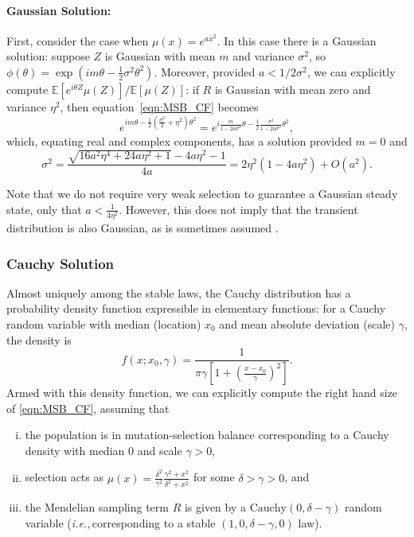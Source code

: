\documentclass{article}
\newcommand{\ie}{\textit{i.e.,}\,}
\newcommand{\1}{\mathbbm{1}}
\theoremstyle{remark}
\theoremstyle{definition}
\begin{document}
\paragraph{Gaussian Solution:}
First, consider the case when $\mu(x) = e^{a x^{2}}$.   In this case there is a Gaussian solution: suppose $Z$ is Gaussian with mean $m$ and variance $\sigma^{2}$, so
$ \phi(\theta) = \exp(i m \theta - \frac{1}{2} \sigma^{2} \theta^{2}).  $
Moreover, provided $a < 1 / 2\sigma^{2}$, we can explicitly compute
$\mathbb{E}\left[e^{i \theta Z}\mu(Z)\right] / \mathbb{E}[\mu(Z)]$:
if $R$ is Gaussian with mean zero and variance $\eta^2$, then equation~\eqref{eqn:MSB_CF} becomes
\[
	e^{i m \theta - \frac{1}{2} \left(\frac{\sigma^{2}}{2} + \eta^{2}\right)\theta^{2}}
	= e^{i \frac{m}{1-2 a \sigma^{2}}\theta 
		- \frac{1}{2} \frac{\sigma^{2}}{1-2 a \sigma^{2}}\theta^{2}},
\]
which, equating real and complex components, has a solution provided $m = 0$ and
\[
	\sigma^{2} = \frac{\sqrt{16 a^{2} \eta^{4} + 24 a \eta^{2}+1} - 4a \eta^{2} -1}{4a} 
	=  2\eta^{2}(1-4a\eta^{2}) + O(a^{2}).
\]

Note that we do not require very weak selection to guarantee a Gaussian steady state, only that $a < \frac{1}{4\eta^{2}}$.  However, this does not imply that the transient distribution is also Gaussian, as is sometimes assumed \citep[e.g.,][]{lande1976natural}. %


\subsubsection{Cauchy Solution}
    \label{sec:stabilizing_cauchy}

Almost uniquely among the stable laws, the Cauchy distribution has a probability density function expressible in elementary functions: 
for a Cauchy random variable with median (location) $x_{0}$ and mean absolute deviation (scale) $\gamma$, the density is 
\begin{equation}\label{eq:Cpdf}
	f(x;x_{0},\gamma) = \frac{1}{\pi\gamma\left[1+\left(\frac{x-x_{0}}{\gamma}\right)^{2}\right]}.  
\end{equation}	
Armed with this density function, we can explicitly compute the right hand size of \eqref{eqn:MSB_CF}, assuming that 
\begin{enumerate}[(i)]
\item the population is in mutation-selection balance corresponding to a Cauchy density with median 0 and scale $\gamma > 0$,
\item selection acts as $\mu(x) = \frac{\delta^{2}}{\gamma^{2}} \frac{\gamma^{2} + x^{2}}{\delta^{2} + x^{2}}$ for some $\delta > \gamma > 0$, and
\item the Mendelian sampling term $R$ is given by a $\text{Cauchy}(0,\delta-\gamma)$ random variable (\ie corresponding to a stable $(1,0,\delta-\gamma,0)$ law).
\end{enumerate}
\end{document}

